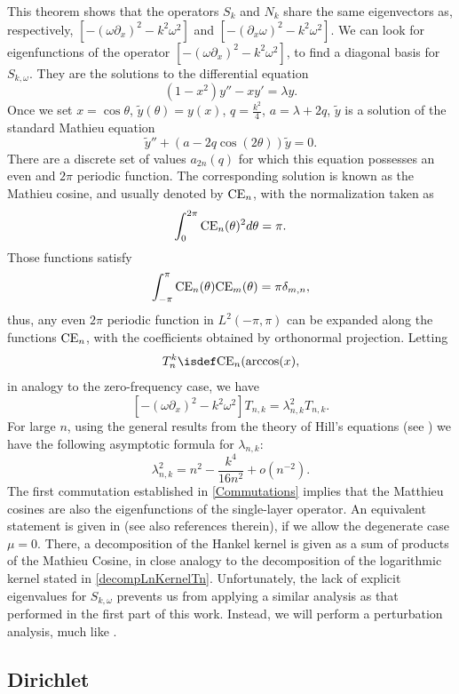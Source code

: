 \documentclass[a4paper]{article}
\begin{document}
This theorem shows that the operators $S_k$ and $N_k$ share the same eigenvectors as, respectively, $\left[-(\omega \partial_x)^2 - k^2\omega^2\right]$ and $ \left[-(\partial_x \omega)^2 - k^2\omega^2\right]$. We can look for eigenfunctions of the operator $\left[ -(\omega \partial_x)^2 - k^2\omega^2\right]$, to find a diagonal basis for $S_{k,\omega}$. They are the solutions to the differential equation 
\[ (1-x^2) y'' - x y' = \lambda y.\]
Once we set $x = \cos \theta$, $\tilde{y}(\theta) = y(x)$,  $q = \frac{k^2}{4}$, $a = \lambda + 2q$, $\tilde{y}$ is a solution of the standard Mathieu equation 
\[\tilde{y}'' + (a - 2q \cos(2\theta)) \tilde{y} = 0.\]
There are a discrete set of values $a_{2n}(q)$ for which this equation possesses an even and $2\pi$ periodic function. The corresponding solution is known as the Mathieu cosine, and usually denoted by $\textup{CE}_n$, with the normalization taken as
\[ \int_{0}^{2\pi} \textup{CE}_n(\theta)^2 d\theta = \pi.\]
Those functions satisfy 
\[ \int_{-\pi}^{\pi}\textup{CE}_n(\theta) \textup{CE}_m(\theta) = \pi \delta_{m,n},\]
thus, any even $2\pi$ periodic function in $L^2(-\pi,\pi)$ can be expanded along the functions $\textup{CE}_n$, with the coefficients obtained by orthonormal projection. Letting 
\[T_{n}^k \isdef \textup{CE}_n(\arccos(x),\]
in analogy to the zero-frequency case, we have
\[\left[-(\omega \partial_x)^2 - k^2\omega^2\right] T_{n,k} = \lambda_{n,k}^2 T_{n,k}.\]
For large $n$, using the general results from the theory of Hill's equations (see \cite[eq. 28.29.21]{NIST:DLMF}) we have the following asymptotic formula for $\lambda_{n,k}$:
\[ \lambda_{n,k}^2 = n^2 - \frac{k^4}{16n^2} +o \left(n^{-2}\right). \]
The first commutation established in \autoref{Commutations} implies that the Matthieu cosines are also the eigenfunctions of the single-layer operator. An equivalent statement is given in \cite[Thm 4.2]{betcke2014spectral} (see also references therein), if we allow the degenerate case $\mu = 0$. There, a decomposition of the Hankel kernel is given as a sum of products of the Mathieu Cosine, in close analogy to the decomposition of the logarithmic kernel stated in \autoref{decompLnKernelTn}. Unfortunately, the lack of explicit eigenvalues for $S_{k,\omega}$ prevents us from applying a similar analysis as that performed in the first part of this work. Instead, we will perform a perturbation analysis, much like \cite{bruno2012second}. 

\subsection{Dirichlet}
\end{document}
